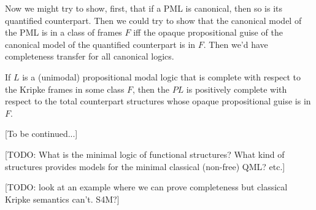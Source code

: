 \documentclass[11pt]{woarticle}
\newcommand{\cmnt}[1]{\iffalse #1 \fi}
\theoremstyle{break}
\theoremstyle{nonumberplain}
\newcommand{\1}{\;\,|\;\,}
\renewcommand{\t}[1]{\ensuremath{\langle #1  \makebox[.2ex]{}\rangle}}
\begin{document}
Now we might try to show, first, that if a PML is canonical, then so is its
quantified counterpart. Then we could try to show that the canonical model of
the PML is in a class of frames $F$ iff the opaque propositional guise of the
canonical model of the quantified counterpart is in $F$. Then we'd have
completeness transfer for all canonical logics.


\begin{theorem}{\label{comptrans}}
  If $L$ is a (unimodal) propositional modal logic that is complete
  with respect to the Kripke frames in some class $F$, then the $PL$
  is positively complete with respect to the total counterpart
  structures whose opaque propositional guise is in $F$.
\end{theorem}

[To be continued...]


\cmnt{%
  (Here we also see that we need multiple counterpart relations: if we
  only had the identity transformation from $w$ to $w$, we would
  validate more principles than P+T?)%
} %


[TODO: What is the minimal logic of functional structures? What kind of
structures provides models for the minimal classical (non-free) QML? etc.]

\cmnt{%
  Consider the class of $C$-functional structures. By lemma \ref{rsl}, in those
  models $\t{y/x}A$ can be replaced by $[y/x]A$, and thus the unmodified
  versions of (LL) and (FUI) from non-modal logic are sound. So is, therefore,
  the necessity of identity, but not the necessity of non-identity. Thus
  functional models provide a general semantics for naive (extensions of)
  mixtures of F with K. And functional models in which things don't go out of
  existence provide the semantics for naive (extensions of) mixtures of Q with
  K.
}%

[TODO: look at an example where we can prove completeness but classical Kripke
semantics can't. S4M?]
\end{document}
